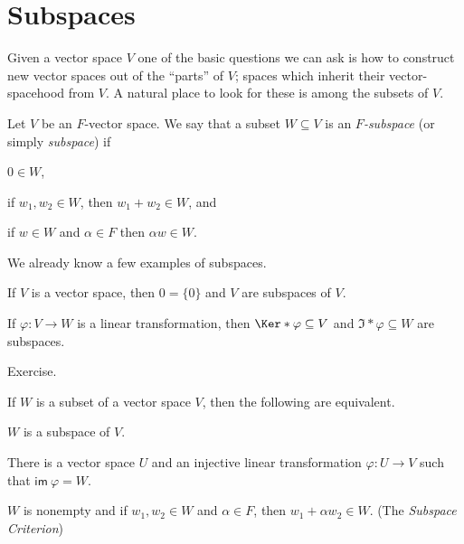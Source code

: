\section{Subspaces}

Given a vector space $V$ one of the basic questions we can ask is how to construct new vector spaces out of the ``parts'' of $V$; spaces which inherit their vector-spacehood from $V$. A natural place to look for these is among the subsets of $V$.

\begin{dfn}
Let $V$ be an $F$-vector space. We say that a subset $W \subseteq V$ is an \emph{$F$-subspace} (or simply \emph{subspace}) if
\begin{inparaenum}
\item $0 \in W$,
\item if $w_1, w_2 \in W$, then $w_1+w_2 \in W$, and
\item if $w \in W$ and $\alpha \in F$ then $\alpha w \in W$.
\end{inparaenum}
\end{dfn}

We already know a few examples of subspaces.

\begin{prp} \mbox{}
\begin{enumerate*}
\item If $V$ is a vector space, then $0 = \{0\}$ and $V$ are subspaces of $V$.
\item If $\varphi : V \rightarrow W$ is a linear transformation, then $\Ker*{\varphi} \subseteq V$ and $\Im*{\varphi} \subseteq W$ are subspaces.
\end{enumerate*}
\end{prp}

\begin{theproof}
Exercise.
\end{theproof}

\begin{prp}
\label{prp:subsp:equiv-char}
If $W$ is a subset of a vector space $V$, then the following are equivalent.
\begin{enumerate*}
\item{\label{prp:subsp:equiv-char:subsp}} $W$ is a subspace of $V$.
\item{\label{prp:subsp:equiv-char:im-trans}} There is a vector space $U$ and an injective linear transformation $\varphi : U \rightarrow V$ such that $\mathsf{im}\ \varphi = W$.
\item{\label{prp:subsp:equiv-char:subsp-crit}} $W$ is nonempty and if $w_1,w_2 \in W$ and $\alpha \in F$, then $w_1 + \alpha w_2 \in W$. (The \emph{Subspace Criterion})
\end{enumerate*}
\end{prp}

